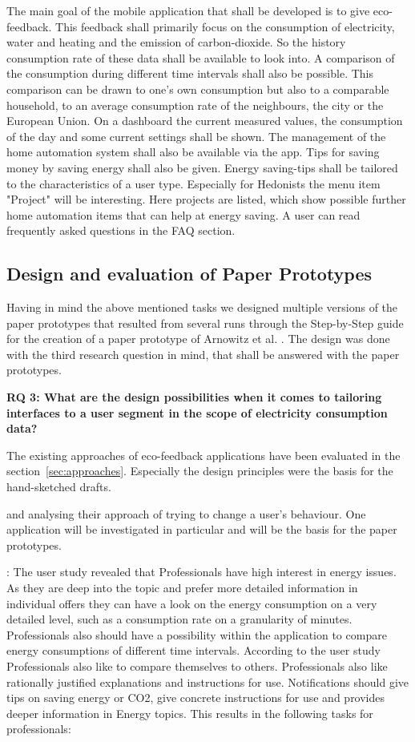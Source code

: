 	The main goal of the mobile application that shall be developed is to give eco-feedback. This feedback shall primarily focus on the consumption of electricity, water and heating and the emission of carbon-dioxide. So the history consumption rate of these data shall be available to look into. A comparison of the consumption during different time intervals shall also be possible. This comparison can be drawn to one's own consumption but also to a comparable household, to an average consumption rate of the neighbours, the city or the European Union. On a dashboard the current measured values, the consumption of the day and some current settings shall be shown. The management of the home automation system shall also be available via the app. Tips for saving money by saving energy shall also be given. Energy saving-tips shall be tailored to the characteristics of a user type. Especially for Hedonists the menu item "Project" will be interesting. Here projects are listed, which show possible further home automation items that can help at energy saving. A user can read frequently asked questions in the FAQ section.
	
	\subsection{Design and evaluation of Paper Prototypes}	
	Having in mind the above mentioned tasks we designed multiple versions of the paper prototypes that resulted from several runs through the Step-by-Step guide for the creation of a paper prototype of Arnowitz et al. \cite{arnowitz2010effective}. The design was done with the third research question in mind, that shall be answered with the paper prototypes.
	
	\textbf{RQ 3: What are the design possibilities when it comes to tailoring interfaces to a user segment in the scope of electricity consumption data?}
	
	The existing approaches of eco-feedback applications have been evaluated in the section~\ref{sec:approaches}. Especially the design principles were the basis for the hand-sketched drafts.
	
	 and analysing their approach of trying to change a user's behaviour. One application will be investigated in particular and will be the basis for the paper prototypes.
	
	: The user study revealed that Professionals have high interest in energy issues. As they are deep into the topic and prefer more detailed information in individual offers they can have a look on the energy consumption on a very detailed level, such as a consumption rate on a granularity of minutes. Professionals also should have a possibility within the application to compare energy consumptions of different time intervals. According to the user study Professionals also like to compare themselves to others. Professionals also like rationally justified explanations and instructions for use. Notifications should give tips on saving energy or CO2, give concrete instructions for use and provides deeper information in Energy topics. This results in the following tasks for professionals:
	

